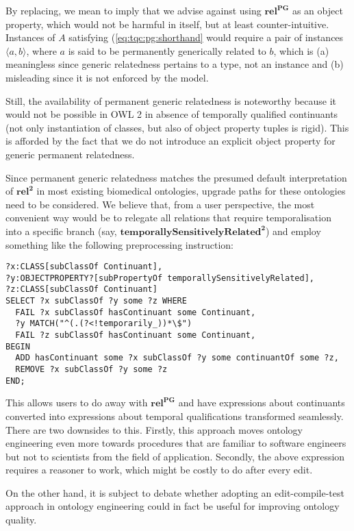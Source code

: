 \documentclass[10pt]{bmc_article}
\newcommand{\mirel}[1]{\ensuremath{\mathrm{\mathbf{#1}}}}
\newcommand{\mclass}[1]{\ensuremath{\mathit{#1}}}
\newcommand{\mrel}[2]{\mirel{#1^#2}}
\newcommand{\mrelb}[1]{\mrel{#1}{2}}
\newcommand{\pair}[2]{\ensuremath{\langle #1,#2\rangle}}
\newcommand{\mrelpg}[1]{\mrel{#1}{{PG}}}
\newenvironment{bmcformat}{\baselineskip20pt\sloppy\setboolean{publ}{false}}{\baselineskip20pt\sloppy}
\begin{document}
\begin{bmcformat}
By replacing, we mean to imply that we advise against using \mrelpg{rel} as an
object property, which would not be harmful in itself, but at least
counter-intuitive. Instances of \mclass{A} satisfying
(\ref{eq:tqc:pg:shorthand} would require a pair of instances \pair{a}{b}, where
$a$ is said to be permanently generically related to $b$, which is (a)
meaningless since generic relatedness pertains to a type, not an instance and
(b) misleading since it is not enforced by the model.

Still, the availability of permanent generic relatedness is noteworthy because
it would not be possible in OWL 2 in absence of temporally qualified
continuants (not only instantiation of classes, but also of object property
tuples is rigid). This is afforded by the fact that we do not introduce an
explicit object property for generic permanent relatedness. 

Since permanent generic relatedness matches the presumed default interpretation
of \mrelb{rel} in most existing biomedical ontologies, upgrade paths for these
ontologies need to be considered. We believe that, from a user perspective, the
most convenient way would be to relegate all relations that require
temporalisation into a specific branch (say,
\mrelb{temporallySensitivelyRelated}) and employ something like the following 
preprocessing instruction:
\begin{lstlisting}
?x:CLASS[subClassOf Continuant],
?y:OBJECTPROPERTY?[subPropertyOf temporallySensitivelyRelated],
?z:CLASS[subClassOf Continuant] 
SELECT ?x subClassOf ?y some ?z WHERE 
  FAIL ?x subClassOf hasContinuant some Continuant,
  ?y MATCH("^(.(?<!temporarily_))*\$")
  FAIL ?z subClassOf hasContinuant some Continuant,
BEGIN
  ADD hasContinuant some ?x subClassOf ?y some continuantOf some ?z,
  REMOVE ?x subClassOf ?y some ?z
END;
\end{lstlisting}
This allows users to do away with \mrelpg{rel} and have expressions about
continuants converted into expressions about temporal qualifications transformed
seamlessly. There are two downsides to this. Firstly, this approach moves
ontology engineering even more towards procedures that are familiar to
software engineers but not to scientists from the field of application.
Secondly, the above expression requires a reasoner to work, which might be
costly to do after every edit.

On the other hand, it is subject to debate whether adopting an edit-compile-test
approach in ontology engineering could in fact be useful for improving ontology quality.


\end{bmcformat}
\end{document}
